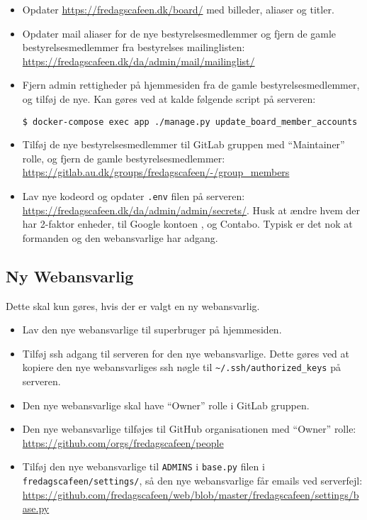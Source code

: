 \begin{itemize}
    \item Opdater \url{https://fredagscafeen.dk/board/} med billeder, aliaser og titler.
    \item Opdater mail aliaser for de nye bestyrelsesmedlemmer og 
    fjern de gamle bestyrelsesmedlemmer fra bestyrelses mailinglisten:\\
    {\small\url{https://fredagscafeen.dk/da/admin/mail/mailinglist/}}
    \item Fjern admin rettigheder på hjemmesiden fra de gamle bestyrelsesmedlemmer, og tilføj de nye.
    Kan gøres ved at kalde følgende script på serveren:
    {\small\begin{verbatim}
$ docker-compose exec app ./manage.py update_board_member_accounts\end{verbatim}}
    \item Tilføj de nye bestyrelsesmedlemmer til GitLab gruppen
    med ``Maintainer'' rolle, og fjern de gamle bestyrelsesmedlemmer:\\
    {\small\url{https://gitlab.au.dk/groups/fredagscafeen/-/group_members}}
    \item Lav nye kodeord og opdater \texttt{.env} filen på serveren:\\
    {\small\url{https://fredagscafeen.dk/da/admin/admin/secrets/}}.
    Husk at ændre hvem der har 2-faktor enheder, til  Google kontoen ,
    og Contabo.
    Typisk er det nok at formanden og den webansvarlige har adgang.
\end{itemize}

\subsection{Ny Webansvarlig}
\label{sec:ny-webansvarlig}

Dette skal kun gøres, hvis der er valgt en ny webansvarlig.
\begin{itemize}
    \item Lav den nye webansvarlige til superbruger på hjemmesiden.
    \item Tilføj ssh adgang til serveren for den nye webansvarlige.
    Dette gøres ved at kopiere den nye webansvarliges ssh nøgle til 
    \texttt{\textasciitilde/.ssh/authorized\_keys} på serveren.
    \item Den nye webansvarlige skal have ``Owner'' rolle i GitLab gruppen.
    \item Den nye webansvarlige tilføjes til GitHub organisationen med ``Owner'' rolle:\\
    {\small\url{https://github.com/orgs/fredagscafeen/people}}
    \item Tilføj den nye webansvarlige til \texttt{ADMINS} i \texttt{base.py} filen i\\
    \texttt{fredagscafeen/settings/}, så den nye webansvarlige får emails ved serverfejl:\\
    {\small\url{https://github.com/fredagscafeen/web/blob/master/fredagscafeen/settings/base.py}}
\end{itemize}
